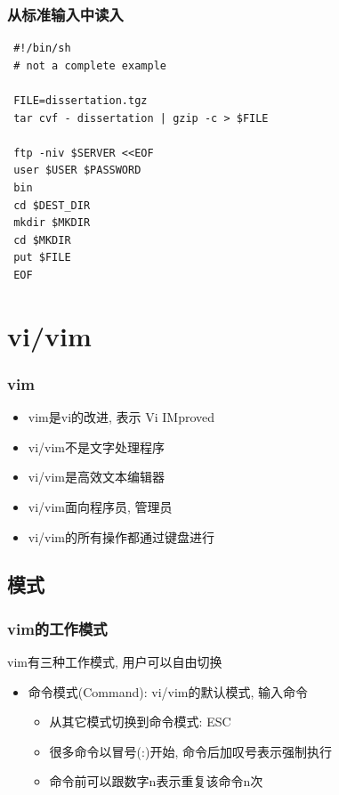 \documentclass[compress]{beamer}
\begin{document}
\begin{frame}[fragile]
\frametitle{从标准输入中读入}

\begin{lstlisting}
 #!/bin/sh
 # not a complete example

 FILE=dissertation.tgz
 tar cvf - dissertation | gzip -c > $FILE

 ftp -niv $SERVER <<EOF
 user $USER $PASSWORD
 bin
 cd $DEST_DIR
 mkdir $MKDIR
 cd $MKDIR
 put $FILE
 EOF
\end{lstlisting}
\end{frame}

\section{vi/vim}


\begin{frame}
	\frametitle{vim}
\begin{itemize}
\item vim是vi的改进, 表示 Vi IMproved
\item vi/vim不是文字处理程序
\item vi/vim是高效文本编辑器
\item vi/vim面向程序员, 管理员
\item vi/vim的所有操作都通过键盘进行
\end{itemize}


\end{frame}

\subsection{模式}

\begin{frame}
\frametitle{vim的工作模式}
vim有三种工作模式, 用户可以自由切换
\begin{itemize}
\item 命令模式(Command): vi/vim的默认模式, 输入命令
    \begin{itemize}
    \item 从其它模式切换到命令模式: ESC
    \item 很多命令以冒号(:)开始, 命令后加叹号表示强制执行
    \item 命令前可以跟数字n表示重复该命令n次
    \end{itemize}
\end{itemize}


\end{frame}
\end{document}
